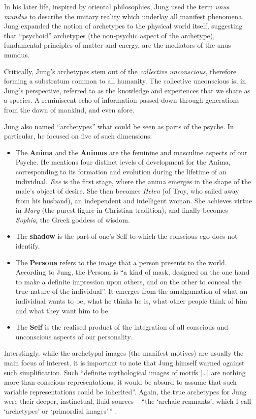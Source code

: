 \documentclass[]{book}
\providecommand{\tightlist}{%
  \setlength{\itemsep}{0pt}\setlength{\parskip}{0pt}}
\begin{document}
In his later life, inspired by oriental philosophies, Jung used the term \emph{unus mundus} to describe the unitary reality which underlay all manifest phenomena. Jung expanded the notion of archetypes to the physical world itself, suggesting that ``psychoid'' archetypes (the non-psychic aspect of the archetype), fundamental principles of matter and energy, are the mediators of the unus mundus.

Critically, Jung's archetypes stem out of the \emph{collective unconscious}, therefore forming a substratum common to all humanity. The collective unconscious is, in Jung's perspective, referred to as the knowledge and experiences that we share as a species. A reminiscent echo of information passed down through generations from the dawn of mankind, and even afore.

Jung also named ``archetypes'' what could be seen as parts of the psyche. In particular, he focused on five of such dimensions:

\begin{itemize}
\tightlist
\item
  The \textbf{Anima} and the \textbf{Animus} are the feminine and masculine aspects of our Psyche. He mentions four distinct levels of development for the Anima, corresponding to its formation and evolution during the lifetime of an individual. \emph{Eve} is the first stage, where the anima emerges in the shape of the male's object of desire. She then becomes \emph{Helen} (of Troy, who sailed away from his husband), an independent and intelligent woman. She achieves virtue in \emph{Mary} (the purest figure in Christian tradition), and finally becomes \emph{Sophia}, the Greek goddess of wisdom.
\item
  The \textbf{shadow} is the part of one's Self to which the conscious ego does not identify.
\item
  The \textbf{Persona} refers to the image that a person presents to the world. According to Jung, the Persona is ``a kind of mask, designed on the one hand to make a definite impression upon others, and on the other to conceal the true nature of the individual''. It emerges from the amalgamation of what an individual wants to be, what he thinks he is, what other people think of him and what they want him to be.
\item
  The \textbf{Self} is the realised product of the integration of all conscious and unconscious aspects of our personality.
\end{itemize}

Interstingly, while the archetypal images (the manifest motives) are usually the main focus of interest, it is important to note that Jung himself warned against such simplification. Such ``definite mythological images of motifs {[}\ldots{]} are nothing more than conscious representations; it would be absurd to assume that such variable representations could be inherited''. Again, the true archetypes for Jung were their deeper, instinctual, fluid sources -- ``the `archaic remnants', which I call `archetypes' or `primordial images'\,'' \citep{jung1964approaching}.
\end{document}
